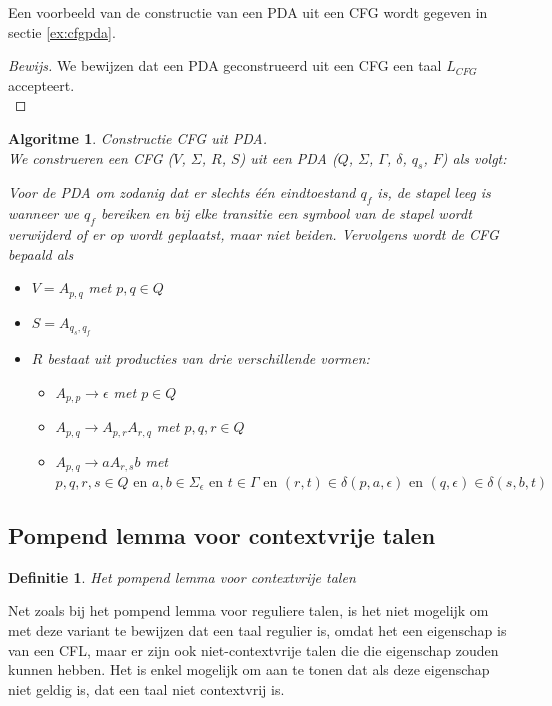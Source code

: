 \documentclass[a4paper]{article}
\newtheorem{tdefinitie}{Definitie}[section]
\newenvironment{definitie}[1]%
  {\begin{mdframed}[backgroundcolor=silver,
    topline=false,
    rightline=false,
    leftline=false,
    bottomline=false]\begin{tdefinitie}#1\\\normalfont}%
  {\end{tdefinitie}\end{mdframed}}
\newtheorem{talgo}{Algoritme}[section]
\newenvironment{algoritme}[1]%
  {\begin{mdframed}[backgroundcolor=silver,
    topline=false,
    rightline=false,
    leftline=false,
    bottomline=false]\begin{talgo}#1\\\normalfont}%
  {\end{talgo}\end{mdframed}}
\newenvironment{bewijs}[1]%
  {\begin{mdframed}[topline=true,
    rightline=true,
    leftline=true,
    bottomline=true]\begin{proof}[Bewijs]#1\\[.2cm]\normalfont}%
  {\end{proof}\end{mdframed}}
\newcommand{\en}{\ensuremath{\text{ en }}}
\begin{document}
Een voorbeeld van de constructie van een PDA uit een CFG wordt gegeven in sectie \ref{ex:cfgpda}.

\begin{bewijs}{We bewijzen dat een PDA geconstrueerd uit een CFG een taal $L_{CFG}$ accepteert.}
  
\end{bewijs}

\begin{algoritme}{Constructie CFG uit PDA.}
  We construeren een CFG ($V$, $\Sigma$, $R$, $S$) uit een PDA ($Q$, $\Sigma$, $\Gamma$, $\delta$, $q_s$, $F$) als volgt:
  
  Voor de PDA om zodanig dat er slechts \'e\'en eindtoestand $q_f$ is, de stapel leeg is wanneer we $q_f$ bereiken en bij elke transitie een symbool van de stapel wordt verwijderd of er op wordt geplaatst, maar niet beiden. Vervolgens wordt de CFG bepaald als
  \begin{itemize}
  \item $V = A_{p,q}$ met $p,q \in Q$
  \item $S = A_{q_s,q_f}$
  \item $R$ bestaat uit producties van drie verschillende vormen:
  \begin{itemize}
  \item $A_{p,p} \rightarrow \epsilon$ met $p \in Q$
  \item $A_{p,q} \rightarrow A_{p,r}A_{r,q}$ met $p,q,r \in Q$
  \item $A_{p,q} \rightarrow aA_{r,s}b$ met $p,q,r,s \in Q \en a,b \in \Sigma_\epsilon \en t \in \Gamma \en (r,t) \in \delta(p,a,\epsilon) \en (q,\epsilon) \in \delta(s,b,t)$
  \end{itemize}
  \end{itemize}
\end{algoritme}

\subsection{Pompend lemma voor contextvrije talen}

\begin{definitie}{Het pompend lemma voor contextvrije talen}
  
\end{definitie}

Net zoals bij het pompend lemma voor reguliere talen, is het niet mogelijk om met deze variant te bewijzen dat een taal regulier is, omdat het een eigenschap is van een CFL, maar er zijn ook niet-contextvrije talen die die eigenschap zouden kunnen hebben. Het is enkel mogelijk om aan te tonen dat als deze eigenschap niet geldig is, dat een taal niet contextvrij is.
\end{document}

